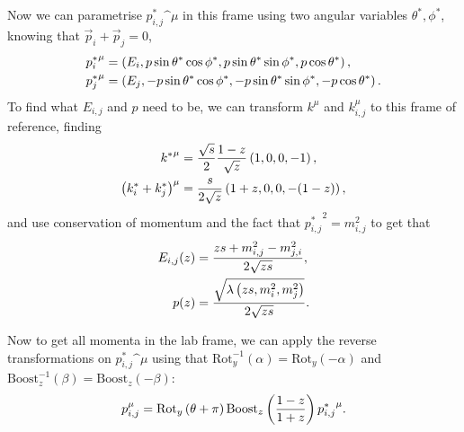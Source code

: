         Now we can parametrise \({p_{i,j}^\ast}\^\mu\) in this frame using two angular variables \(\theta^\ast, \phi^\ast\), knowing that \(\vec{p}_i + \vec{p}_j = 0\),
        \begin{subequations}
            \begin{align}
                {p_i^\ast}\^\mu & = \pclosed{E_i, p\sin\theta^\ast \cos\phi^\ast, p\sin\theta^\ast \sin\phi^\ast, p \cos\theta^\ast},    \\
                {p_j^\ast}\^\mu & = \pclosed{E_j, -p\sin\theta^\ast \cos\phi^\ast, -p\sin\theta^\ast \sin\phi^\ast, -p \cos\theta^\ast}.
            \end{align}
        \end{subequations}
        To find what \(E_{i,j}\) and \(p\) need to be, we can transform \(k^\mu\) and \(k_{i,j}^\mu\) to this frame of reference, finding
        \begin{subequations}
            \begin{align}
                {k^\ast}\^\mu                      & = \frac{\sqrt{s}}{2} \frac{1-z}{\sqrt{z}} \pclosed{1, 0, 0, -1}, \\
                \pclosed{k_i^\ast + k_j^\ast}\^\mu & = \frac{s}{2\sqrt{z}} \pclosed{1+z, 0, 0, -(1-z)},
            \end{align}
        \end{subequations}
        and use conservation of momentum and the fact that \({p_{i,j}^\ast}^2 = m^2_{i,j}\) to get that
        \begin{subequations}
            \begin{align}
                E_{i,j}(z) & = \frac{zs + m^2_{i,j} - m^2_{j,i}}{2 \sqrt{zs}},               \\
                p(z)       & = \frac{\sqrt{\lambda\left(zs, m^2_i, m^2_j\right)}}{2 \sqrt{zs}}.
            \end{align}
        \end{subequations}

        Now to get all momenta in the lab frame, we can apply the reverse transformations on \({p_{i,j}^\ast}\^\mu\) using that \(\text{Rot}^{-1}_y(\alpha) = \text{Rot}_y(-\alpha)\) and \(\text{Boost}_z^{-1}(\beta) = \text{Boost}_z(-\beta)\):
            \begin{equation}
                p_{i,j}^\mu = \text{Rot}_y\pclosed{\theta+\pi} \text{Boost}_z\pclosed{\frac{1-z}{1+z}} {p_{i,j}^\ast}\^\mu.
            \end{equation}



